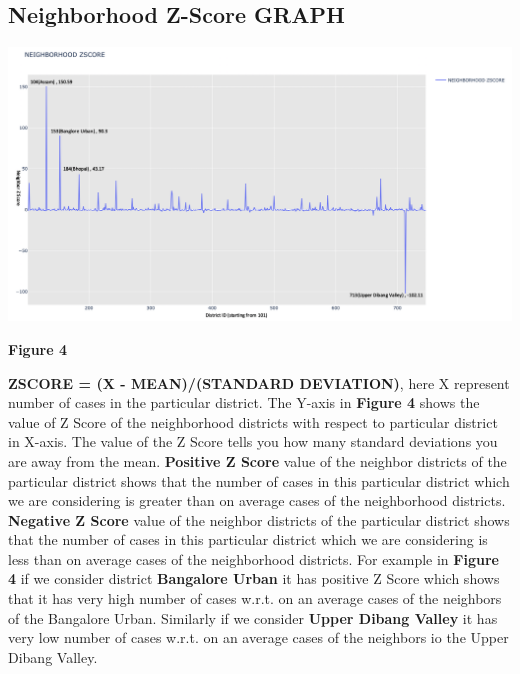 \documentclass{report}
\begin{document}
\newpage 
\subsection{Neighborhood Z-Score GRAPH}
\includegraphics[scale=0.346]{Neighbor Z Score}
\centerline{\textbf{Figure 4}} \newline\newline
\newline \textbf{ZSCORE = (X - MEAN)/(STANDARD DEVIATION)}, here X represent number of cases in the particular district.
\newline \justify The Y-axis in \textbf{Figure 4} shows the value of Z Score of the neighborhood districts with respect to particular district in X-axis. The value of the Z Score tells you how many standard deviations you are away from the mean. \textbf{Positive Z Score} value of the neighbor districts of the particular district shows that the number of cases in this particular district which we are considering is greater than on average cases of the neighborhood districts. \textbf{Negative Z Score} value of the neighbor districts of the particular district shows that the number of cases in this particular district which we are considering is less than on average cases of the neighborhood districts. 
\newline For example in \textbf{Figure 4} if we consider district \textbf{Bangalore Urban} it has positive Z Score which shows that it has very high number of cases w.r.t. on an average cases of the neighbors of the Bangalore Urban. Similarly if we consider \textbf{Upper Dibang Valley} it has very low number of cases w.r.t. on an average cases of the neighbors io the Upper Dibang Valley.

\newpage 
\end{document}
